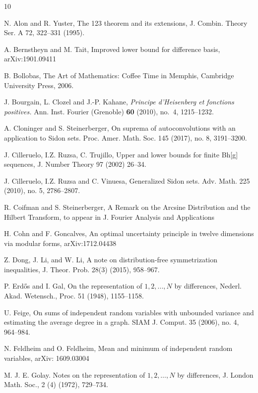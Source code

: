 \documentclass{amsart}
\theoremstyle{remark}
\begin{document}
{\begin{thebibliography}{10}

 N. Alon and R. Yuster, The 123 theorem and its extensions, J. Combin. Theory Ser. A 72, 322--331 (1995).


 A. Bernstheyn and M. Tait, Improved lower bound for difference basis, arXiv:1901.09411

 B. Bollobas, The Art of Mathematics: Coffee Time in Memphis, Cambridge University Press, 2006.

 J. Bourgain, L. Clozel and J.-P. Kahane,  
\emph{Principe d'Heisenberg et fonctions positives.}
 Ann. Inst. Fourier (Grenoble) {\bf 60} (2010), no.~4, 1215--1232. 

  A. Cloninger and S. Steinerberger, On suprema of autoconvolutions with an application to Sidon sets.
Proc. Amer. Math. Soc. 145 (2017), no. 8, 3191--3200. 


 J. Cilleruelo, I.Z. Ruzsa, C. Trujillo, Upper and lower bounds for finite Bh[g] sequences, J. Number Theory 97 (2002) 26--34.

 J. Cilleruelo, I.Z. Ruzsa and C. Vinuesa, Generalized Sidon sets. Adv. Math. 225 (2010), no. 5, 2786--2807.

 R. Coifman and S. Steinerberger, A Remark on the Arcsine Distribution and the Hilbert Transform, to appear in J. Fourier Analysis and Applications

 H. Cohn and F. Goncalves, An optimal uncertainty principle in twelve dimensions via modular forms, arXiv:1712.04438


  Z. Dong, J. Li, and W. Li, A note on distribution-free symmetrization inequalities, J. Theor.
Prob. 28(3) (2015), 958--967.

 P. Erd\H{o}s and I. Gal, On the representation of $1, 2, . . . , N$ by differences, Nederl. Akad. Wetensch., Proc. 51 (1948), 1155--1158.


 U. Feige, 
On sums of independent random variables with unbounded variance and estimating the average degree in a graph. 
SIAM J. Comput. 35 (2006), no. 4, 964--984. 

 N. Feldheim and O. Feldheim, Mean and minimum of independent random variables, arXiv: 1609.03004


 M. J. E. Golay. Notes on the representation of $1, 2, \dots, N$ by differences, J. London Math.
Soc., 2 (4) (1972),  729--734.


\end{thebibliography}}
\end{document}
